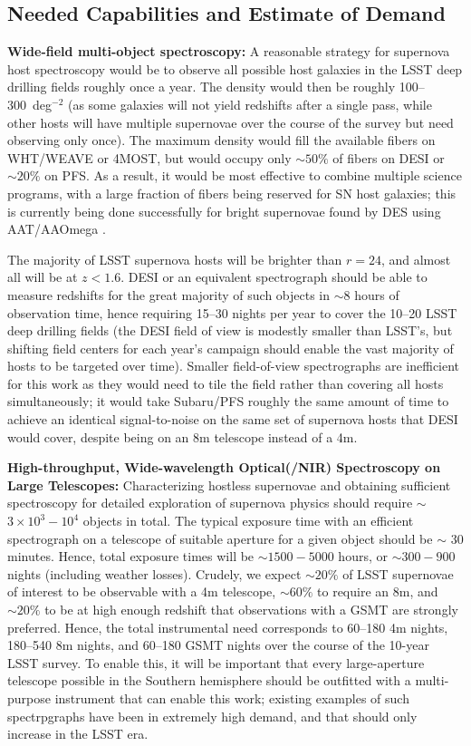\subsection{Needed Capabilities and Estimate of Demand}

{\bf Wide-field multi-object spectroscopy:}  A reasonable strategy for supernova host spectroscopy would be to observe all possible host galaxies in the LSST deep drilling fields 
roughly once a year.  The density would then be roughly
100--300~deg$^{-2}$ (as some galaxies will not yield redshifts after a
single pass, while other hosts will have multiple supernovae over the course of the survey but need observing only once).  The maximum density would fill the available fibers on WHT/WEAVE or 4MOST, but would occupy only $\sim 50\%$ of fibers on DESI or $\sim 20\%$ on PFS.    As a result, it would be most effective to combine multiple science programs, with a large fraction of fibers being reserved for SN host galaxies; this is
currently being done successfully for bright supernovae found by DES using AAT/AAOmega
\citep{Yuan15}.

The majority of LSST supernova hosts will be brighter than $r=24$, and almost all will be at $z<1.6$.  DESI or an equivalent spectrograph should be able to measure redshifts for the great majority of such objects in $\sim 8$ hours of observation time, hence requiring 15--30 nights per year to cover the 10--20 LSST deep drilling fields (the DESI field of view is modestly smaller than LSST's, but shifting field centers for each year's campaign should enable the vast majority of hosts to be targeted over time).  Smaller field-of-view spectrographs are inefficient for this work as they would need to tile the field rather than covering all hosts simultaneously; it would take Subaru/PFS roughly the same amount of time to achieve an identical signal-to-noise on the same set of supernova hosts that DESI would cover, despite being on an 8m telescope instead of a 4m.  

{\bf High-throughput, Wide-wavelength Optical(/NIR) Spectroscopy on Large Telescopes:}  Characterizing hostless supernovae and obtaining sufficient spectroscopy for detailed exploration of supernova physics should require $\sim$ $3\times10^3 -10^4$ objects in total.  The typical exposure time with an efficient spectrograph on a telescope of suitable aperture for a given object should be $\sim$ 30 minutes.  Hence, total exposure times will be $\sim 1500-5000$ hours, or $\sim 300-900$ nights (including weather losses).  Crudely, we expect $\sim 20\%$ of LSST supernovae of interest to be observable with a 4m telescope, $\sim 60\%$ to require an 8m, and $\sim 20\%$ to be at high enough redshift that observations with a GSMT are strongly preferred.  Hence, the total instrumental need corresponds to 60--180 4m nights, 180--540 8m nights, and 60--180 GSMT nights over the course of the 10-year LSST survey.  To enable this, it will be important that every large-aperture telescope possible in the Southern hemisphere should be outfitted with a multi-purpose instrument that can enable this work; existing examples of such spectrpgraphs have been in extremely high demand, and that should only increase in the LSST era.

